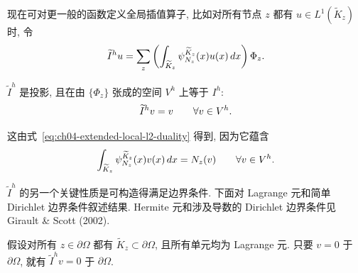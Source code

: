 现在可对更一般的函数定义全局插值算子, 比如对所有节点 $z$ 都有 $u\in L^1(\widetilde K_z)$ 时, 令
\begin{equation}
\MathBookFormulaID{formula-ch04-generalized-global-interpolant}
\label{eq:ch04-generalized-global-interpolant}
\widetilde I^h u=\sum_z\left(\int_{\widetilde K_z}
\psi_{N_z}^{\widetilde K_z}(x)u(x)\,dx\right)\Phi_z.
\end{equation}

\setcounter{thmcount}{6}
\begin{Theorem}
\label{thm:ch04-generalized-interpolant-projection}
$\widetilde I^h$ 是投影, 且在由 $\{\Phi_z\}$ 张成的空间 $V^h$ 上等于 $I^h$:
\[
\MathBookFormulaID{formula-ch04-generalized-interpolant-projection}
\widetilde I^h v=v\qquad\forall v\in V^h.
\]
\end{Theorem}
\begin{Proof}
这由式~\eqref{eq:ch04-extended-local-l2-duality} 得到, 因为它蕴含
\[
\MathBookFormulaID{formula-ch04-generalized-interpolant-nodal-recovery}
\int_{\widetilde K_z}\psi_{N_z}^{\widetilde K_z}(x)v(x)\,dx
=N_z(v)\qquad\forall v\in V^h.
\]
\end{Proof}

$\widetilde I^h$ 的另一个关键性质是可构造得满足边界条件. 下面对 Lagrange 元和简单 Dirichlet 边界条件叙述结果. Hermite 元和涉及导数的 Dirichlet 边界条件见 Girault \& Scott (2002).

\setcounter{thmcount}{7}
\begin{Theorem}
\label{thm:ch04-generalized-interpolant-boundary-condition}
假设对所有 $z\in\partial\Omega$ 都有 $\widetilde K_z\subset\partial\Omega$, 且所有单元均为 Lagrange 元. 只要 $v=0$ 于 $\partial\Omega$, 就有 $\widetilde I^h v=0$ 于 $\partial\Omega$.
\end{Theorem}

